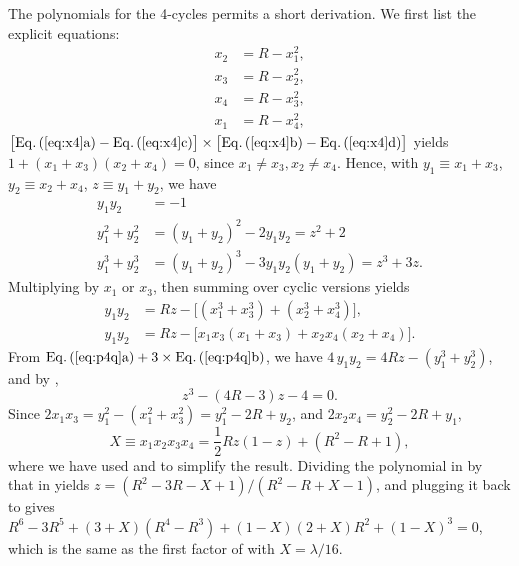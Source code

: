 \documentclass{ws-ijbc}
\begin{document}
The polynomials for the 4-cycles permits a short derivation.
We first list the explicit equations:
%
%
%
\begin{subequations}
\label{eq:x4}
\begin{align}
  x_2 &= R - x_1^2, \\
  x_3 &= R - x_2^2, \\
  x_4 &= R - x_3^2, \\
  x_1 &= R - x_4^2,
\end{align}
\end{subequations}
%
$\big[\mathrm{\refeqsub{x4}{a}} - \mathrm{\refeqsub{x4}{c}}\big]
\times
\big[\mathrm{\refeqsub{x4}{b}} - \mathrm{\refeqsub{x4}{d}}\big]$
yields $1 + (x_1 + x_3) (x_2 + x_4) = 0$,
since $x_1 \ne x_3, x_2 \ne x_4$.
%
Hence, with
$y_1 \equiv x_1 + x_3$, $y_2 \equiv x_2 + x_4$,
$z \equiv y_1 + y_2$,
we have
%
%
%
\begin{subequations}
\begin{align}
y_1 y_2       &= -1 \\
y_1^2 + y_2^2 & = (y_1 + y_2)^2 - 2 y_1 y_2 = z^2 + 2 \\
y_1^3 + y_2^3 & = (y_1 + y_2)^3 - 3 y_1 y_2 (y_1 + y_2) = z^3 + 3 z.
\end{align}
\label{eq:ypow4}
\end{subequations}
%
%
Multiplying  by $x_1$ or $x_3$,
then summing over cyclic versions yields
\begin{subequations}
\begin{align}
y_1 y_2 &= R z - \big[(x_1^3 + x_3^3) + (x_2^3 + x_4^3)\big],\\
y_1 y_2 &= R z - \big[x_1 x_3 (x_1 + x_3) + x_2 x_4 (x_2 + x_4)\big].
\end{align}
\label{eq:p4q}
\end{subequations}
%
From
$\mathrm{\refeqsub{p4q}{a}} + 3 \times \mathrm{\refeqsub{p4q}{b}}$,
we have
$4 \, y_1 y_2 = 4 R z - (y_1^3 + y_2^3)$,
%
and by ,
\begin{equation}
  z^3 - (4 R - 3) z - 4 = 0.
  \label{eq:xr4s}
\end{equation}
%
%
Since $2 x_1 x_3 = y_1^2 - (x_1^2 + x_3^2) = y_1^2 - 2 R + y_2$,
and $2 x_2 x_4 = y_2^2 - 2 R + y_1$,
%
\begin{equation}
  X \equiv x_1 x_2 x_3 x_4 = \frac{1}{2} R z(1 - z) + (R^2 - R + 1),
\label{eq:der4}
\end{equation}
where we have used  and  to simplify the result.
%
Dividing the polynomial in  by that in 
yields $z = (R^2-3R-X+1)/(R^2-R+X-1)$,
and plugging it back to  gives
   $R^6 -3 R^5
  + (3 + X) (R^4 - R^3)
  + (1 - X) (2 + X) R^2
  + (1 - X)^3 = 0$,
which is the same as the first factor of 
  with $X = \lambda/16$.
\end{document}
